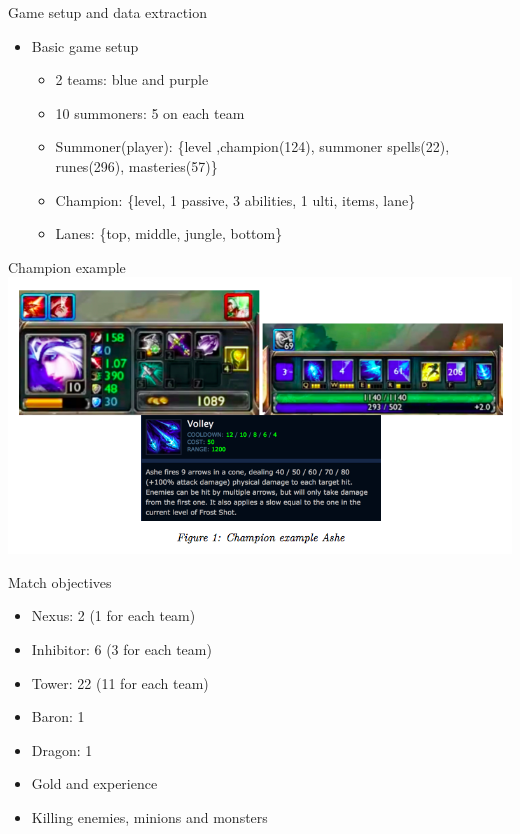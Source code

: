 \begin{frame}{Game setup and data extraction}
\begin{itemize}
\item Basic game setup
\begin{itemize}
\item 2 teams: blue and purple
\item 10 summoners: 5 on each team
\item Summoner(player): \{level ,champion(124), summoner spells(22), runes(296), masteries(57)\}
\item Champion: \{level, 1 passive, 3 abilities, 1 ulti, items, lane\}
\item Lanes: \{top, middle, jungle, bottom\}
\end{itemize}
\end{itemize}
\end{frame}
\begin{frame}{Champion example}
\includegraphics[scale=0.4]{leagueoflegends/ashe}
\end{frame}
\begin{frame}{Match objectives}
\begin{itemize}
\item Nexus: 2 (1 for each team)
\item Inhibitor: 6 (3 for each team)
\item Tower: 22 (11 for each team)
\item Baron: 1
\item Dragon: 1 
\item Gold and experience
\item Killing enemies, minions and monsters
\end{itemize}
\end{frame}
